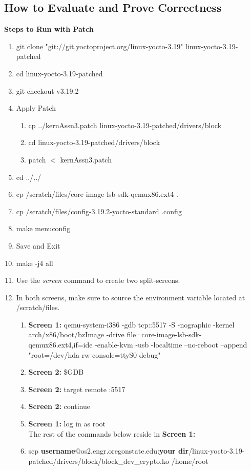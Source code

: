 \documentclass[draftclsnofoot, onecolumn, 10pt, compsoc]{IEEEtran}
\begin{document}
		\subsection{How to Evaluate and Prove Correctness}
			\textbf{Steps to Run with Patch}
			\begin{enumerate}
				\item git clone "git://git.yoctoproject.org/linux-yocto-3.19" linux-yocto-3.19-patched
				\item cd linux-yocto-3.19-patched
				\item git checkout v3.19.2
				\item Apply Patch
				\begin{enumerate}
					\item cp ../kernAssn3.patch linux-yocto-3.19-patched/drivers/block
					\item cd linux-yocto-3.19-patched/drivers/block
					\item patch $<$ kernAssn3.patch
				\end{enumerate}
				\item cd ../../
				\item cp /scratch/files/core-image-lsb-sdk-qemux86.ext4 .
				\item cp /scratch/files/config-3.19.2-yocto-standard .config
				\item make menuconfig
				\item Save and Exit
				\item make -j4 all
				\item Use the \textit{screen} command to create two split-screens.
				\item In both screens, make sure to source the environment variable located at /scratch/files.
				\begin{enumerate}
					\item \textbf{Screen 1:}
						qemu-system-i386 -gdb tcp::5517 -S -nographic -kernel arch/x86/boot/bzImage -drive file=core-image-lsb-sdk-qemux86.ext4,if=ide -enable-kvm -usb -localtime --no-reboot --append "root=/dev/hda rw console=ttyS0 debug"
					\item \textbf{Screen 2:} \$GDB
					\item \textbf{Screen 2:} target remote :5517
					\item \textbf{Screen 2:} continue
					\item \textbf{Screen 1:} log in as root \\
						The rest of the commands below reside in \textbf{Screen 1:}
					\item scp \textbf{username}@os2.engr.oregonstate.edu:\textbf{your dir}/linux-yocto-3.19-patched/drivers/block/block\_dev\_crypto.ko /home/root

\end{enumerate}
\end{enumerate}
\end{document}

